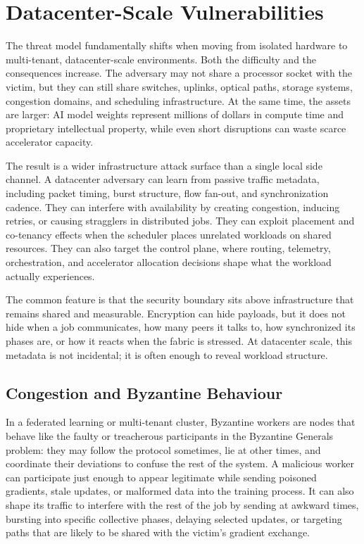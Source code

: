 \section{Datacenter-Scale Vulnerabilities}
\label{sec:datacenter-scale}

The threat model fundamentally shifts when moving from isolated hardware to multi-tenant, datacenter-scale environments. Both the difficulty and the consequences increase. The adversary may not share a processor socket with the victim, but they can still share switches, uplinks, optical paths, storage systems, congestion domains, and scheduling infrastructure. At the same time, the assets are larger: AI model weights represent millions of dollars in compute time and proprietary intellectual property, while even short disruptions can waste scarce accelerator capacity.

The result is a wider infrastructure attack surface than a single local side channel. A datacenter adversary can learn from passive traffic metadata, including packet timing, burst structure, flow fan-out, and synchronization cadence. They can interfere with availability by creating congestion, inducing retries, or causing stragglers in distributed jobs. They can exploit placement and co-tenancy effects when the scheduler places unrelated workloads on shared resources. They can also target the control plane, where routing, telemetry, orchestration, and accelerator allocation decisions shape what the workload actually experiences.

The common feature is that the security boundary sits above infrastructure that remains shared and measurable. Encryption can hide payloads, but it does not hide when a job communicates, how many peers it talks to, how synchronized its phases are, or how it reacts when the fabric is stressed. At datacenter scale, this metadata is not incidental; it is often enough to reveal workload structure.

\subsection{Congestion and Byzantine Behaviour}
\label{sec:congestion-byzantine}

In a federated learning or multi-tenant cluster, Byzantine workers are nodes that behave like the faulty or treacherous participants in the Byzantine Generals problem: they may follow the protocol sometimes, lie at other times, and coordinate their deviations to confuse the rest of the system. A malicious worker can participate just enough to appear legitimate while sending poisoned gradients, stale updates, or malformed data into the training process. It can also shape its traffic to interfere with the rest of the job by sending at awkward times, bursting into specific collective phases, delaying selected updates, or targeting paths that are likely to be shared with the victim's gradient exchange.

